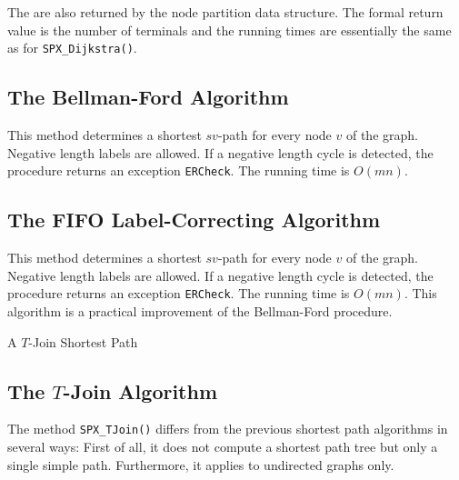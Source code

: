 \documentclass[a4paper,11pt,twoside]{book}
\begin{document}
\begin{multicols}{2}
The  are also returned by the node partition data structure.
The formal return value is the number of terminals and the running times are
essentially the same as for \verb/SPX_Dijkstra()/.


\subsection{The Bellman-Ford Algorithm}
This method determines a shortest $sv$-path for every node $v$ of the graph.
Negative length labels are allowed. If a negative length cycle is detected,
the procedure returns an exception \verb/ERCheck/. The running time
is $O(mn)$.


\subsection{The FIFO Label-Correcting Algorithm}
This method determines a shortest $sv$-path for every node $v$ of the graph.
Negative length labels are allowed. If a negative length cycle is detected,
the procedure returns an exception \verb/ERCheck/. The running time
is $O(mn)$. This algorithm is a practical improvement of the Bellman-Ford
procedure.

\bigskip
\begin{figurehere}
\begin{center}
\epsfxsize=9cm
\vspace{0.5cm}
\caption{\label{flb_tjoin}A $T$-Join Shortest Path}
\end{center}
\end{figurehere}


\subsection{The $T$-Join Algorithm}
The method \verb/SPX_TJoin()/ differs from the previous shortest path algorithms
in several ways: First of all, it does not compute a shortest path tree but
only a single simple path. Furthermore, it applies to undirected graphs only.


\end{multicols}
\end{document}
